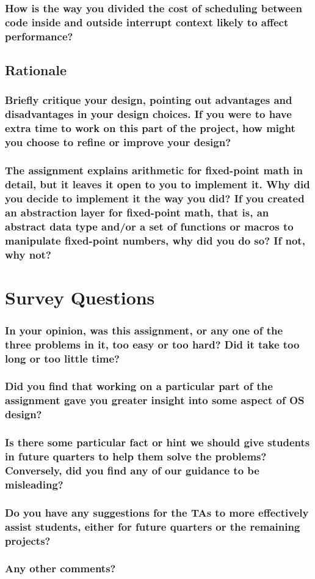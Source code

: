 \documentclass[sigconf, nonacm]{acmart}
\begin{document}
            \subsubsection{How is the way you divided the cost of scheduling between code inside and outside interrupt context likely to affect performance? }

        \subsection{Rationale}

            \subsubsection{Briefly critique your design, pointing out advantages and disadvantages in your design choices. If you were to have extra time to work on this part of the project, how might you choose to refine or improve your design? }

            \subsubsection{The assignment explains arithmetic for fixed-point math in detail, but it leaves it open to you to implement it. Why did you decide to implement it the way you did? If you created an abstraction layer for fixed-point math, that is, an abstract data type and/or a set of functions or macros to manipulate fixed-point numbers, why did you do so? If not, why not?}
    
    \section{Survey Questions}

        \subsubsection*{In your opinion, was this assignment, or any one of the three problems in it, too easy or too hard? Did it take too long or too little time? }

        \subsubsection*{Did you find that working on a particular part of the assignment gave you greater insight into some aspect of OS design? }

        \subsubsection*{Is there some particular fact or hint we should give students in future quarters to help them solve the problems? Conversely, did you find any of our guidance to be misleading? }

        \subsubsection*{Do you have any suggestions for the TAs to more effectively assist students, either for future quarters or the remaining projects? }

        \subsubsection*{Any other comments? }
\end{document}

